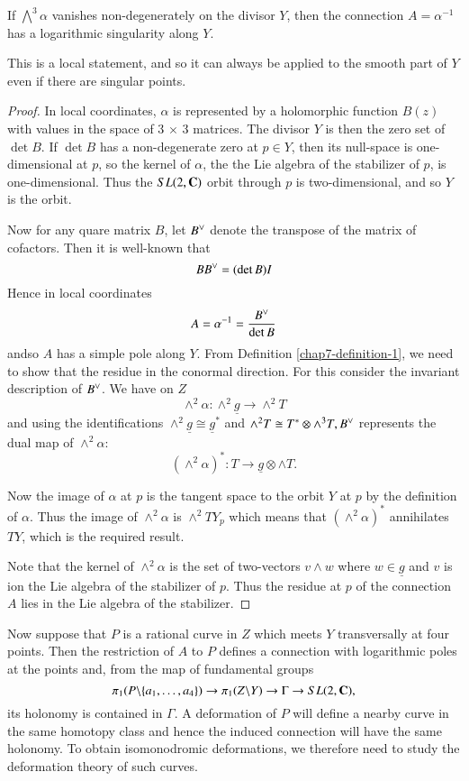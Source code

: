 \begin{proposition}\label{chap7-proposition-2}
If $\bigwedge^{3}\alpha$ vanishes non-degenerately on the divisor $Y$, then the connection $A = \alpha^{-1}$ has a logarithmic singularity along $Y$.
\end{proposition}

This is a local statement, and so it can always be applied to the smooth part of $Y$ even if there are singular points.

\begin{proof}
In local coordinates, $\alpha$ is represented by a holomorphic function $B(z)$ with values in the space of 3 $\times$ 3 matrices. The divisor $Y$ is then the zero set of $\det B$. If $\det B$ has a non-degenerate zero at $p \in Y$, then its null-space is one-dimensional at $p$, so the kernel of $\alpha$, the the Lie algebra of the stabilizer of $p$, is one-dimensional. Thus the $SL(2, \mathbf{C})$ orbit through $p$ is two-dimensional, and so $Y$ is the orbit.

Now for any quare matrix $B$, let $B\spcheck$ denote the transpose of the matrix of cofactors. Then it is well-known that
$$
BB\spcheck = (\det B)I
$$
Hence in local coordinates
$$
A = \alpha^{-1} = \dfrac{B\spcheck}{\det B}
$$
and\pageoriginale so $A$ has a simple pole along $Y$. From Definition \ref{chap7-definition-1}, we need to show that the residue in the conormal direction. For this consider the invariant description of $B\spcheck$. We have on $Z$
$$
\wedge^{2} \alpha : \wedge^{2}\underline{g} \rightarrow \wedge^{2}T
$$ 
and using the identifications $\wedge^{2}\underline{g} \cong \underline{g}^{*}$ and $\wedge^{2}T \cong T^{*} \otimes \wedge^{3}T, B\spcheck$ represents the dual map of $\wedge^{2}\alpha$:
$$
(\wedge^{2}\alpha)^{*} : T\rightarrow \underline{g} \otimes \wedge T.
$$

Now the image of $\alpha$ at $p$ is the tangent space to the orbit $Y$ at $p$ by the definition of $\alpha$. Thus the image of $\wedge^{2} \alpha$ is $\wedge^{2}TY_{p}$ which means that $ (\wedge^{2}\alpha)^{*}$ annihilates $TY$, which is the required result.

Note that the kernel of $\wedge^{2}\alpha$ is the set of two-vectors $v \wedge w$ where $w \in \underline{g}$ and $v$ is ion the Lie algebra of the stabilizer of $p$. Thus the residue at $p$ of the connection $A$ lies in the Lie algebra of the stabilizer.
\end{proof}

Now suppose that $P$ is a rational curve in $Z$ which meets $Y$ transversally at four points. Then the restriction of $A$ to $P$ defines a connection with logarithmic poles at the points and, from the map of fundamental groups
$$
\pi_{1}(P\backslash \{a_{1},\ldots, a_{4}\})\rightarrow \pi_{1}(Z\backslash Y)\rightarrow \Gamma \rightarrow SL(2, \mathbf{C}),
$$
its holonomy is contained in $\Gamma$. A deformation of $P$ will define a nearby curve in the same homotopy class and hence the induced connection will have the same holonomy. To obtain isomonodromic deformations, we therefore need to study the deformation theory of such curves.

